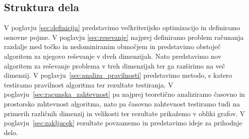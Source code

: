 \subsection{Struktura dela} 
V poglavju \ref{sec:definicija} predstavimo večkriterijsko optimizacijo in definiramo osnovne pojme. V poglavju \ref{sec:resevanje} najprej definiramo problem računanja razdalje med točko in nedominiranim območjem in predstavimo obstoječ algoritem za njegovo reševanje v dveh dimenzijah. Nato predstavimo nov algoritem za reševanje problema v treh dimenzijah ter ga razširimo na več dimenzij. V poglavju~\ref{sec:analiza_pravilnosti} predstavimo metodo, s katero testiramo pravilnost algoritma ter rezultate testiranja. V poglavju~\ref{sec:racunska_zahtevnost} pa najprej teoretično analiziramo časovno in prostorsko zahtevnost algoritma, nato pa časovno zahtevnost testiramo tudi na primerih različnih dimenzij in velikosti ter rezultate prikažemo v obliki grafov. V poglavju~\ref{sec:zakljucek} rezultate povzamemo in predstavimo ideje za prihodnje delo. 